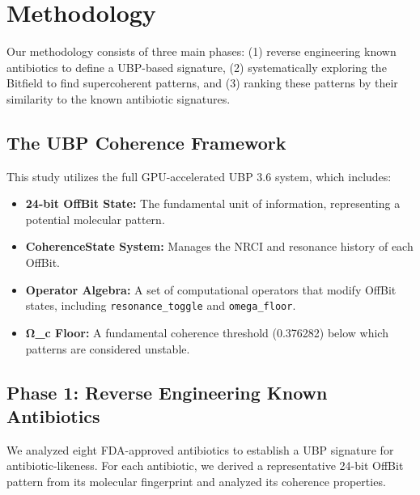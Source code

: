 \documentclass[12pt, a4paper]{article}
\begin{document}
\section{Methodology}

Our methodology consists of three main phases: (1) reverse engineering known antibiotics to define a UBP-based signature, (2) systematically exploring the Bitfield to find supercoherent patterns, and (3) ranking these patterns by their similarity to the known antibiotic signatures.

\subsection{The UBP Coherence Framework}

This study utilizes the full GPU-accelerated UBP 3.6 system, which includes:

\begin{itemize}
    \item \textbf{24-bit OffBit State:} The fundamental unit of information, representing a potential molecular pattern.
    \item \textbf{CoherenceState System:} Manages the NRCI and resonance history of each OffBit.
    \item \textbf{Operator Algebra:} A set of computational operators that modify OffBit states, including \texttt{resonance\_toggle} and \texttt{omega\_floor}.
    \item \textbf{Ω_c Floor:} A fundamental coherence threshold (0.376282) below which patterns are considered unstable.
\end{itemize}

\subsection{Phase 1: Reverse Engineering Known Antibiotics}

We analyzed eight FDA-approved antibiotics to establish a UBP signature for antibiotic-likeness. For each antibiotic, we derived a representative 24-bit OffBit pattern from its molecular fingerprint and analyzed its coherence properties.
\end{document}
